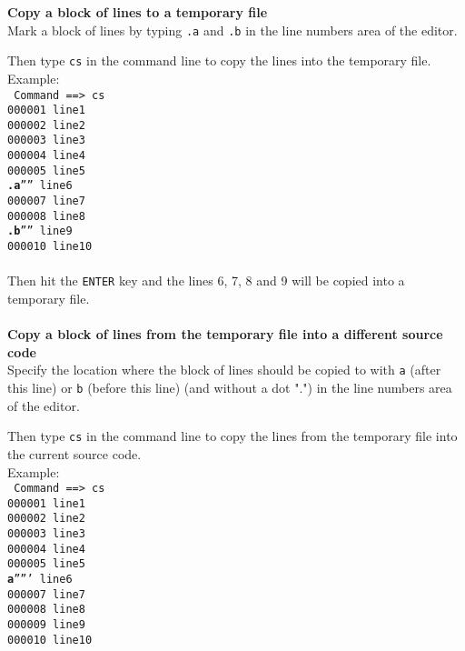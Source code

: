 \documentclass{report}
\begin{document}
\textbf{Copy a block of lines to a temporary file} \\
Mark a block of lines by typing \texttt{.a} and \texttt{.b} in the line numbers
area of the editor.

Then type \texttt{cs} in the command line to copy the lines into the temporary
file. \\

Example: \\

\texttt{
Command ==> cs \\
000001 line1 \\
000002 line2 \\
000003 line3 \\
000004 line4 \\
000005 line5 \\
\textbf{.a}'''' line6 \\
000007 line7 \\
000008 line8 \\
\textbf{.b}'''' line9 \\
000010 line10 \\
} \\
\break
Then hit the \texttt{ENTER} key and the lines 6, 7, 8 and 9 will be copied
into a temporary file.
\\
\\

\textbf{Copy a block of lines from the temporary file into a different source code} \\

Specify the location where the block of lines should be copied to with
\texttt{a} (after this line) or \texttt{b} (before this line) (and without
a dot ".") in the line numbers area of the editor.

Then type \texttt{cs} in the command line to copy the lines from the temporary
file into the current source code. \\

Example: \\

\texttt{
Command ==> cs \\
000001 line1 \\
000002 line2 \\
000003 line3 \\
000004 line4 \\
000005 line5 \\
\textbf{a}''''' line6 \\
000007 line7 \\
000008 line8 \\
000009 line9 \\
000010 line10 \\
}
\end{document}
